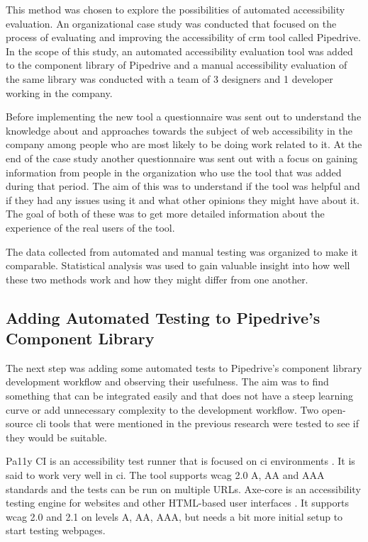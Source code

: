\documentclass{master_thesis}
\begin{document}
This method was chosen to explore the possibilities of automated accessibility evaluation. An organizational case study was conducted that focused on the process of evaluating and improving the accessibility of \ac{crm} tool called Pipedrive. In the scope of this study, an automated accessibility evaluation tool was added to the component library of Pipedrive and a manual accessibility evaluation of the same library was conducted with a team of 3 designers and 1 developer working in the company.

Before implementing the new tool a questionnaire was sent out to understand the knowledge about and approaches towards the subject of web accessibility in the company among people who are most likely to be doing work related to it. At the end of the case study another questionnaire was sent out with a focus on gaining information from people in the organization who use the tool that was added during that period. The aim of this was to understand if the tool was helpful and if they had any issues using it and what other opinions they might have about it. The goal of both of these was to get more detailed information about the experience of the real users of the tool.

The data collected from automated and manual testing was organized to make it comparable. Statistical analysis was used to gain valuable insight into how well these two methods work and how they might differ from one another.

\subsection{Adding Automated Testing to Pipedrive's Component Library} \label{adding-a11y-tool}

The next step was adding some automated tests to Pipedrive's component library development workflow and observing their usefulness. The aim was to find something that can be integrated easily and that does not have a steep learning curve or add unnecessary complexity to the development workflow. Two open-source \ac{cli} tools that were mentioned in the previous research were tested to see if they would be suitable.

Pa11y CI is an accessibility test runner that is focused on \ac{ci} environments \citep{TeamPa11y2022}. It is said to work very well in \ac{ci}. The tool supports \ac{wcag} 2.0 A, AA and AAA standards and the tests can be run on multiple URLs. Axe-core is an accessibility testing engine for websites and other HTML-based user interfaces \citep{Deque2023}. It supports \ac{wcag} 2.0 and 2.1 on levels A, AA, AAA, but needs a bit more initial setup to start testing webpages.
\end{document}
